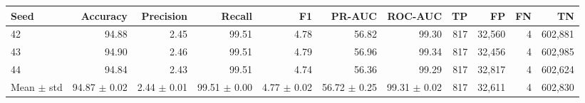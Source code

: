 \begin{tabular}{lrrrrrrrrrr}
\toprule
Seed & Accuracy & Precision & Recall & F1 & PR-AUC & ROC-AUC & TP & FP & FN & TN \\
\midrule
42 & 94.88 & 2.45 & 99.51 & 4.78 & 56.82 & 99.30 & 817 & 32{,}560 & 4 & 602{,}881 \\
43 & 94.90 & 2.46 & 99.51 & 4.79 & 56.96 & 99.34 & 817 & 32{,}456 & 4 & 602{,}985 \\
44 & 94.84 & 2.43 & 99.51 & 4.74 & 56.36 & 99.29 & 817 & 32{,}817 & 4 & 602{,}624 \\
\midrule
Mean $\pm$ std & 94.87 $\pm$ 0.02 & 2.44 $\pm$ 0.01 & 99.51 $\pm$ 0.00 & 4.77 $\pm$ 0.02 & 56.72 $\pm$ 0.25 & 99.31 $\pm$ 0.02 & 817 & 32{,}611 & 4 & 602{,}830 \\
\bottomrule
\end{tabular}